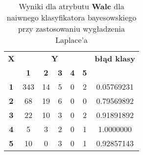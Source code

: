 \begin{table}[h]
\caption{Wyniki dla atrybutu \textbf{Walc} dla naiwnego klasyfikatora bayesowskiego przy zastosowaniu wygładzenia Laplace'a}
\centering
\begin{tabular}{|c|c|c|c|c|c|c|}
\hline
\multirow{}{}{\textbf{X}} & \multicolumn{5}{c|}{\textbf{Y}}                                & \multirow{}{}{\textbf{błąd klasy}} \\ \cline{2-6}
                            & \textbf{1} & \textbf{2} & \textbf{3} & \textbf{4} & \textbf{5} &                                      \\ \hline
\textbf{1}                  & 343        & 14         & 5          & 0          & 2          & 0.05769231                           \\ \hline
\textbf{2}                  & 68         & 19         & 6          & 0          & 0          & 0.79569892                           \\ \hline
\textbf{3}                  & 22         & 10         & 3          & 0          & 2          & 0.91891892                           \\ \hline
\textbf{4}                  & 5          & 3          & 2          & 0          & 1          & 1.0000000                            \\ \hline
\textbf{5}                  & 10         & 0          & 3          & 0          & 1          & 0.92857143                           \\ \hline
\end{tabular}
\end{table}
